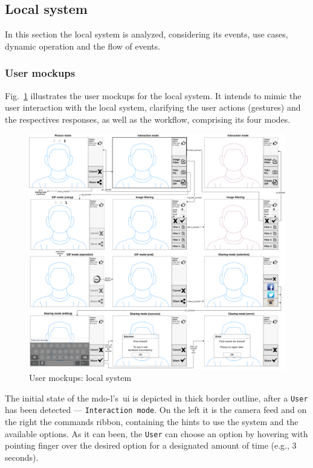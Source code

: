 %
\subsection{Local system}
\label{sec:local-system}
In this section the local system is analyzed, considering its events, use cases,
dynamic operation and the flow of events.
%
\subsubsection{User mockups}
\label{sec:user-mockups}
Fig.~\ref{fig:user-mockups-local} illustrates the user mockups for the local
system. It intends to mimic the user interaction with the local system,
clarifying the user actions (gestures) and the respectives responses, as well as
the workflow, comprising its four modes.
%
\begin{figure}[htb!]
\centering
    \includegraphics[width=1.0\columnwidth]{./img/user-mockups-local.png}
  \caption{User mockups: local system}%
\label{fig:user-mockups-local}
\end{figure}

The initial state of the \gls{mdo-l}'s~\gls{ui} is depicted in thick border
outline, after a \texttt{User} has been detected --- \texttt{Interaction
  mode}. On the left it is the camera feed and on the right the commands ribbon,
containing the hints to use the system and the available options. As it can
been, the \texttt{User} can choose an option by hovering with pointing finger
over the desired option for a designated amount of time (e.g., 3 seconds).

